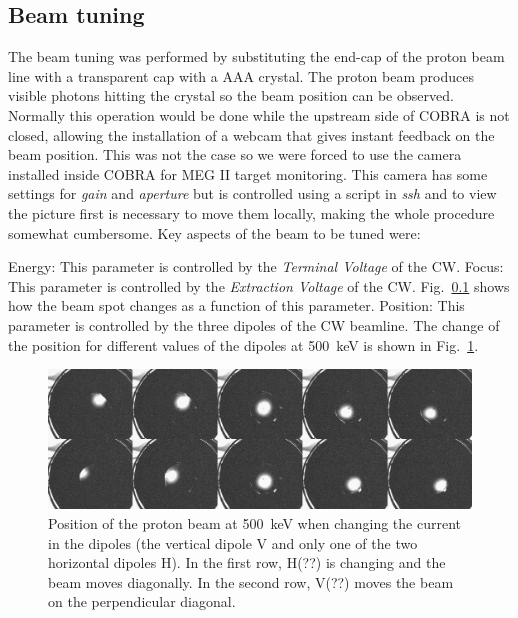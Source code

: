 \begin{refsection}
\subsection{Beam tuning}
The beam tuning was performed by substituting the end-cap of the proton beam line with a transparent cap with a AAA crystal. 
The proton beam produces visible photons hitting the crystal so the beam position can be observed.
Normally this operation would be done while the upstream side of COBRA is not closed, allowing the installation of a webcam that gives instant feedback on the beam position.
This was not the case so we were forced to use the camera installed inside COBRA for MEG II target monitoring.
This camera has some settings for \textit{gain} and \textit{aperture} but is controlled using a script in \textit{ssh} and to view the picture first is necessary to move them locally, making the whole procedure somewhat cumbersome.
Key aspects of the beam to be tuned were: 
\begin{outline}
    \1 Energy: This parameter is controlled by the \textit{Terminal Voltage} of the CW.
    \1 Focus: This parameter is controlled by the \textit{Extraction Voltage} of the CW. Fig.~\ref{} shows how the beam spot changes as a function of this parameter. 
    \1 Position: This parameter is controlled by the three dipoles of the CW beamline. The change of the position for different values of the dipoles at \SI{500}{keV} is shown in Fig.~\ref{fig:position_500keV}.
\end{outline}

\begin{figure}
    \centering
    \includegraphics[width = \textwidth]{Figures/MEG/X17/beamtuning/psotion_500keV.png}
    \caption{Position of the proton beam at \SI{500}{keV} when changing the current in the dipoles (the vertical dipole V and only one of the two horizontal dipoles H). In the first row, H(??) is changing and the beam moves diagonally. In the second row, V(??) moves the beam on the perpendicular diagonal.}
    \label{fig:position_500keV}
\end{figure}


\end{refsection}
